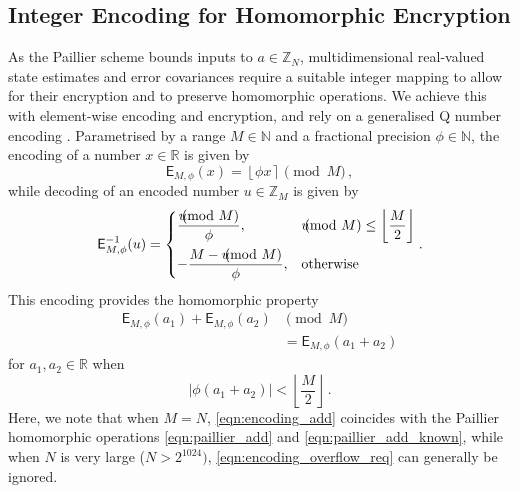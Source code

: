 \documentclass[letterpaper, 10 pt, conference]{ieeeconf}
\begin{document}
\subsection{Integer Encoding for Homomorphic Encryption}\label{subsec:encoding}
As the Paillier scheme bounds inputs to $a\in \mathbb{Z}_N$, multidimensional real-valued state estimates and error covariances require a suitable integer mapping to allow for their encryption and to preserve homomorphic operations. We achieve this with element-wise encoding and encryption, and rely on a generalised Q number encoding \cite{oberstarFixedPointRepresentationFractional2007}. Parametrised by a range $M\in \mathbb{N}$ and a fractional precision $\phi \in \mathbb{N}$, the encoding of a number $x\in\mathbb{R}$ is given by
\begin{equation}
    \mathsf{E}_{M,\phi}(x) = \left\lfloor \phi x \right\rceil \pmod{M}\,,
\end{equation}
while decoding of an encoded number $u\in\mathbb{Z}_M$ is given by
\begin{equation}
    \mathsf{E}^{-1}_{M,\phi}(u) =
    \begin{dcases}
        \frac{u \hspace{-8pt}\pmod{M}}{\phi}, &u \hspace{-8pt}\pmod{M} \leq \left\lfloor\frac{M}{2}\right\rfloor \\
        -\frac{M - u \hspace{-8pt}\pmod{M}}{\phi}, & \text{otherwise} \\
    \end{dcases}.
\end{equation}
This encoding provides the homomorphic property
\begin{equation}\label{eqn:encoding_add}
    \begin{split}
        \mathsf{E}_{M,\phi}(a_1) + \mathsf{E}_{M,\phi}(a_2)& \pmod{M}\\
        &= \mathsf{E}_{M,\phi}(a_1+a_2)
    \end{split}
\end{equation}
for $a_1,a_2\in\mathbb{R}$ when
\begin{equation}\label{eqn:encoding_overflow_req}
    \left|\phi(a_1+a_2)\right| < \left\lfloor \frac{M}{2} \right\rfloor\,.
\end{equation}
Here, we note that when $M=N$, \eqref{eqn:encoding_add} coincides with the Paillier homomorphic operations \eqref{eqn:paillier_add} and \eqref{eqn:paillier_add_known}, while when $N$ is very large ($N>2^{1024})$, \eqref{eqn:encoding_overflow_req} can generally be ignored.
\end{document}
